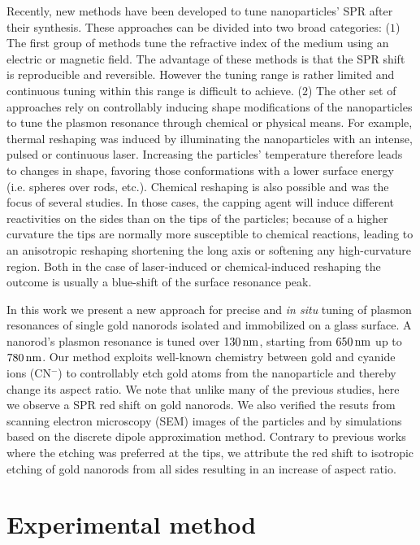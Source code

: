 Recently, new methods have been developed to tune nanoparticles' SPR after their
synthesis. These approaches can be divided into two broad categories: ($1$) The
first group of methods tune the refractive index of the medium using an electric
or magnetic field\cite{Kossyrev2005}. The advantage of these methods is that the
SPR shift is reproducible and reversible. However the tuning range is rather
limited and continuous tuning within this range is difficult to achieve. ($2$)
The other set of approaches rely on controllably inducing shape modifications of
the nanoparticles to tune the plasmon resonance through chemical or physical
means. For example, thermal reshaping was induced by illuminating the
nanoparticles with an intense, pulsed  \cite{Link2000,Horiguchi2008} or
continuous laser\cite{Yorulmaz2012}. Increasing the particles' temperature
therefore leads to changes in shape, favoring those conformations with a lower
surface energy (i.e. spheres over rods, etc.). Chemical reshaping is also
possible and was the focus of several
studies\cite{Carbo-Argibay2007,Rodriguez-Fernandez2005,Jana2002,Tsung2006,Ni2008}.
In those cases, the capping agent will induce different reactivities on the sides than on
the tips of the particles; because of a higher curvature\cite{Yuan2015} the tips
are normally more susceptible to chemical reactions, leading to an anisotropic
reshaping shortening the long axis or softening any high-curvature region. Both
in the case of laser-induced or chemical-induced reshaping the outcome is
usually a blue-shift of the surface resonance peak.

In this work we present a new approach for precise and \textit{in situ} tuning
of plasmon resonances of single gold nanorods isolated and immobilized on a glass
surface. A nanorod's plasmon resonance is tuned over $130\,\textrm{nm}$, starting from
$650\,\textrm{nm}$ up to $780\,\textrm{nm}$. Our method exploits well-known chemistry between gold
and cyanide ions (CN$^{-}$) to controllably etch gold atoms from the
nanoparticle and thereby change its aspect ratio. We note that unlike many of
the previous studies, here we observe a SPR red shift on gold nanorods. We also
verified the resuts from scanning electron microscopy (SEM) images of the
particles and by simulations based on the discrete dipole approximation method.
Contrary to previous works where the etching was preferred at the tips, we
attribute the red shift to isotropic etching of gold nanorods from all sides
resulting in an increase of aspect ratio.

\section{Experimental method}

